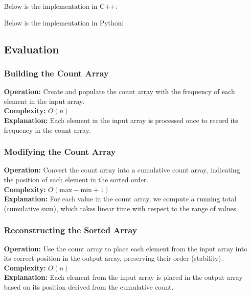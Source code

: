 \begin{minipage}{\linewidth}
    Below is the implementation in C++:
    
\end{minipage}

Below is the implementation in Python:


\subsection{Evaluation}
\subsubsection{Building the Count Array}
\textbf{Operation:} Create and populate the count array with the frequency of each element in the input array. \\
\textbf{Complexity:} \(O(n)\) \\
\textbf{Explanation:} Each element in the input array is processed once to record its frequency in the count array.

\subsubsection{Modifying the Count Array}
\textbf{Operation:} Convert the count array into a cumulative count array, indicating the position of each element in the sorted order. \\
\textbf{Complexity:} \(O(\text{max} - \text{min} + 1)\) \\
\textbf{Explanation:} For each value in the count array, we compute a running total (cumulative sum), which takes linear time with respect to the range of values.

\subsubsection{Reconstructing the Sorted Array}
\textbf{Operation:} Use the count array to place each element from the input array into its correct position in the output array, preserving their order (stability). \\
\textbf{Complexity:} \(O(n)\) \\
\textbf{Explanation:} Each element from the input array is placed in the output array based on its position derived from the cumulative count.

